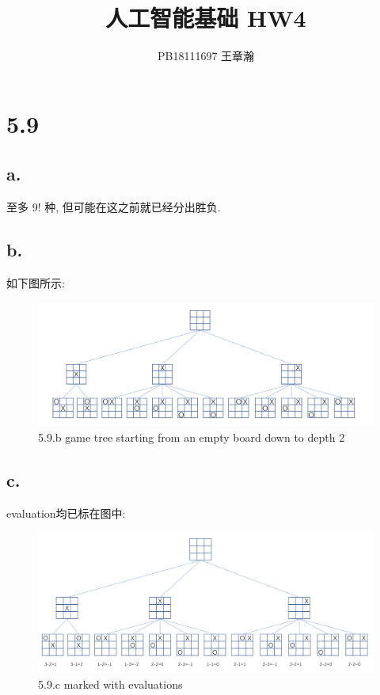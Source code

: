\documentclass[UTF8]{article}
\title{人工智能基础 HW4}
\author{PB18111697 王章瀚}
\begin{document}
\maketitle
\section*{5.9}
\subsection*{a.}
至多 $9!$ 种, 但可能在这之前就已经分出胜负.
\subsection*{b.}
如下图所示:
\begin{figure}[H]
	\centering
	\includegraphics[width=\linewidth]{image/5.9.tree.png}
	\caption{5.9.b game tree starting from an empty board down to depth 2}
\end{figure}\par
\subsection*{c.}
evaluation均已标在图中:
\begin{figure}[H]
	\centering
	\includegraphics[width=\linewidth]{image/5.9.tree_marked.png}
	\caption{5.9.c marked with evaluations}
\end{figure}\par
\end{document}
